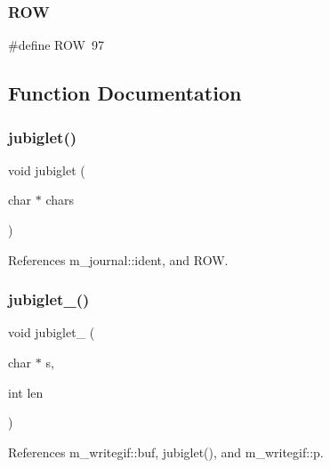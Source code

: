 \mbox{\label{C-jubiglet_8c_ac6f18a9e1d00b4637522b1b469a92021}} 
\subsubsection{\texorpdfstring{R\+OW}{ROW}}
{\footnotesize\ttfamily \#define R\+OW~97}



\subsection{Function Documentation}
\mbox{\label{C-jubiglet_8c_adc484767e979a59ef703547d98fab384}} 
\subsubsection{\texorpdfstring{jubiglet()}{jubiglet()}}
{\footnotesize\ttfamily void jubiglet (\begin{DoxyParamCaption}\item[{char $\ast$}]{chars }\end{DoxyParamCaption})}



References m\+\_\+journal\+::ident, and R\+OW.

\mbox{\label{C-jubiglet_8c_a6a4a6c766aa968996649c44415282c91}} 
\subsubsection{\texorpdfstring{jubiglet\+\_\+()}{jubiglet\_()}}
{\footnotesize\ttfamily void jubiglet\+\_\+ (\begin{DoxyParamCaption}\item[{char $\ast$}]{s,  }\item[{int}]{len }\end{DoxyParamCaption})}



References m\+\_\+writegif\+::buf, jubiglet(), and m\+\_\+writegif\+::p.

